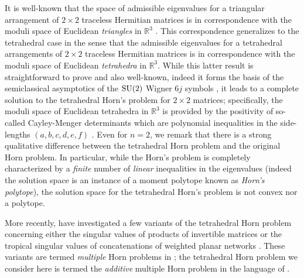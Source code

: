 \documentclass[notitlepage, 10pt]{article}
\begin{document}
It is well-known that the space of admissible eigenvalues for a triangular arrangement of $2\times 2$ traceless Hermitian matrices is in correspondence with the moduli space of Euclidean \textit{triangles} in $\mathbb R^{3}$ \cite{hausmann1996polygon,freidel2010holomorphic,knutson2000symplectic}.
This correspondence generalizes to the tetrahedral case in the sense that the admissible eigenvalues for a tetrahedral arrangements of $2\times 2$ traceless Hermitian matrices is in correspondence with the moduli space of Euclidean \textit{tetrahedra} in $\mathbb R^{3}$.
While this latter result is straightforward to prove and also well-known, indeed it forms the basis of the semiclassical asymptotics of the $\operatorname{SU}(2)$ Wigner $6j$ symbols \cite{roberts1999classical}, it leads to a complete solution to the tetrahedral Horn's problem for $2\times 2$ matrices;
specifically, the moduli space of Euclidean tetrahedra in $\mathbb R^3$ is provided by the positivity of so-called Cayley-Menger determinants which are polynomial inequalities in the side-lengths $(a,b,c,d,e,f)$ \cite{sitharam2018handbook}.
Even for $n=2$, we remark that there is a strong qualitative difference between the tetrahedral Horn problem and the original Horn problem.
In particular, while the Horn's problem is completely characterized by a \textit{finite} number of \textit{linear} inequalities in the eigenvalues (indeed the solution space is an instance of a moment polytope known as \textit{Horn's polytope}), the solution space for the tetrahedral Horn's problem is not convex nor a polytope.

More recently, \citeauthor{alekseev2025multiple} have investigated a few variants of the tetrahedral Horn problem concerning either the singular values of products of invertible matrices or the tropical singular values of concatenations of weighted planar networks \cite{alekseev2025multiple}.
These variants are termed \textit{multiple} Horn problems in \cite{alekseev2025multiple}; the tetrahedral Horn problem we consider here is termed the \textit{additive} multiple Horn problem in the language of \cite{alekseev2025multiple}.
\end{document}
